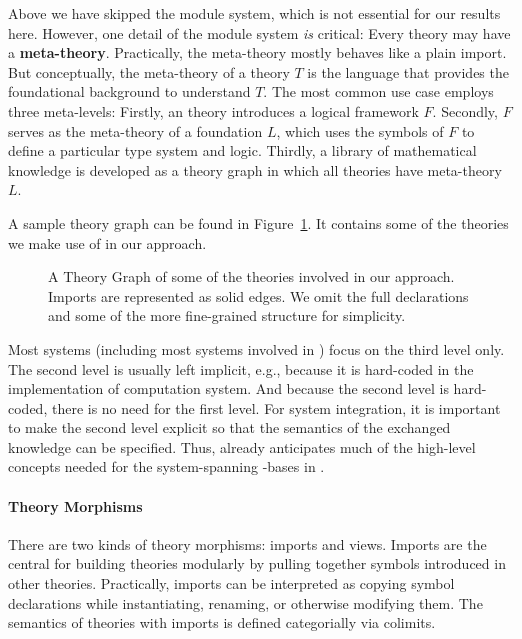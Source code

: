

Above we have skipped the \MMT module system, which is not essential for our results here.
However, one detail of the \MMT module system \emph{is} critical: Every theory may have a \textbf{meta-theory}.
Practically, the meta-theory mostly behaves like a plain import.
But conceptually, the meta-theory of a theory $T$ is the language that provides the foundational background to understand $T$.
The most common use case employs three meta-levels: Firstly, an \MMT theory introduces a logical framework $F$.
Secondly, $F$ serves as the meta-theory of a foundation $L$, which uses the symbols of $F$ to define a particular type system and logic.
Thirdly, a library of mathematical knowledge is developed as a theory graph in which all theories have meta-theory $L$.

A sample theory graph can be found in Figure~\ref{fig:odk_theories}.
It contains some of the theories we make use of in our approach.

\begin{figure}[ht]\centering
  \providecommand\myxscale{3}
  \providecommand\myyscale{1.5}
  \providecommand\myfontsize{\footnotesize}
             
  \caption[Theories involved in our architecture]{A Theory Graph of some of the theories
    involved in our approach.  Imports are represented as solid edges.  We omit the full
    declarations and some of the more fine-grained structure for simplicity.  }
  \label{fig:odk_theories}
\end{figure}


Most systems (including most systems involved in \pn) focus on the third level only.
The second level is usually left implicit, e.g., because it is hard-coded in the implementation of computation system.
And because the second level is hard-coded, there is no need for the first level.
For system integration, it is important to make the second level explicit so that the semantics of the exchanged knowledge can be specified.
Thus, \MMT already anticipates much of the high-level concepts needed for the system-spanning \DKS-bases in \pn.

\paragraph{Theory Morphisms}
There are two kinds of theory morphisms: imports and views.  Imports are the central for
building theories modularly by pulling together symbols introduced in other theories.
Practically, imports can be interpreted as copying symbol declarations while
instantiating, renaming, or otherwise modifying them.  The semantics of theories with
imports is defined categorially via colimits.

